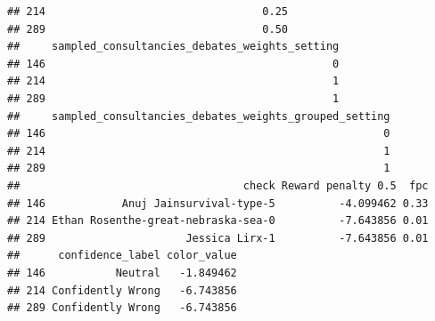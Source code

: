 \documentclass[
]{article}
\newenvironment{Shaded}{\begin{snugshade}}{\end{snugshade}}
\newcommand{\AttributeTok}[1]{\textcolor[rgb]{0.13,0.29,0.53}{#1}}
\newcommand{\CommentTok}[1]{\textcolor[rgb]{0.56,0.35,0.01}{\textit{#1}}}
\newcommand{\FloatTok}[1]{\textcolor[rgb]{0.00,0.00,0.81}{#1}}
\newcommand{\FunctionTok}[1]{\textcolor[rgb]{0.13,0.29,0.53}{\textbf{#1}}}
\newcommand{\NormalTok}[1]{#1}
\newcommand{\OtherTok}[1]{\textcolor[rgb]{0.56,0.35,0.01}{#1}}
\newcommand{\SpecialCharTok}[1]{\textcolor[rgb]{0.81,0.36,0.00}{\textbf{#1}}}
\newcommand{\StringTok}[1]{\textcolor[rgb]{0.31,0.60,0.02}{#1}}
\begin{document}
\begin{verbatim}
## 214                                  0.25
## 289                                  0.50
##     sampled_consultancies_debates_weights_setting
## 146                                             0
## 214                                             1
## 289                                             1
##     sampled_consultancies_debates_weights_grouped_setting
## 146                                                     0
## 214                                                     1
## 289                                                     1
##                                   check Reward penalty 0.5  fpc
## 146            Anuj Jainsurvival-type-5          -4.099462 0.33
## 214 Ethan Rosenthe-great-nebraska-sea-0          -7.643856 0.01
## 289                      Jessica Lirx-1          -7.643856 0.01
##      confidence_label color_value
## 146           Neutral   -1.849462
## 214 Confidently Wrong   -6.743856
## 289 Confidently Wrong   -6.743856
\end{verbatim}

\begin{Shaded}
\end{Shaded}
\end{document}
